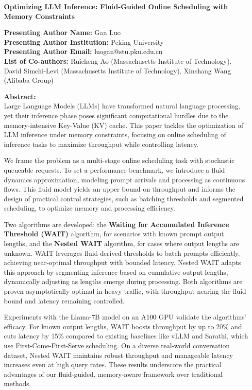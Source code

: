 \documentclass{article}
\begin{document}
\begin{center}
    \Large\textbf{Optimizing LLM Inference: Fluid-Guided Online Scheduling with Memory Constraints}
\end{center}

\noindent\textbf{Presenting Author Name:} Gan Luo \\
\textbf{Presenting Author Institution:} Peking University \\
\textbf{Presenting Author Email:} luogan@stu.pku.edu.cn \\
\textbf{List of Co-authors:} Ruicheng Ao (Massachusetts Institute of Technology), David Simchi-Levi (Massachusetts Institute of Technology), Xinshang Wang (Alibaba Group)

\textbf{Abstract:} \\
Large Language Models (LLMs) have transformed natural language processing, yet their inference phase poses significant computational hurdles due to the memory-intensive Key-Value (KV) cache. This paper tackles the optimization of LLM inference under memory constraints, focusing on online scheduling of inference tasks to maximize throughput while controlling latency.

We frame the problem as a multi-stage online scheduling task with stochastic queueable requests. To set a performance benchmark, we introduce a fluid dynamics approximation, modeling prompt arrivals and processing as continuous flows. This fluid model yields an upper bound on throughput and informs the design of practical control strategies, such as batching thresholds and segmented scheduling, to optimize memory and processing efficiency.

Two algorithms are developed: the \textbf{Waiting for Accumulated Inference Threshold (WAIT)} algorithm, for scenarios with known prompt output lengths, and the \textbf{Nested WAIT} algorithm, for cases where output lengths are unknown. WAIT leverages fluid-derived thresholds to batch prompts efficiently, achieving near-optimal throughput with bounded latency. Nested WAIT adapts this approach by segmenting inference based on cumulative output lengths, dynamically adjusting as lengths emerge during processing. Both algorithms are proven asymptotically optimal in heavy traffic, with throughput nearing the fluid bound and latency remaining controlled.

Experiments with the Llama-7B model on an A100 GPU validate the algorithms’ efficacy. For known output lengths, WAIT boosts throughput by up to 20\% and cuts latency by 15\% compared to existing baselines like vLLM and Sarathi, which use First-Come-First-Serve scheduling. On a diverse real-world conversation dataset, Nested WAIT maintains robust throughput and manageable latency increases even at high query rates. These results underscore the practical advantages of our fluid-guided, memory-aware framework over traditional methods.
\end{document}
